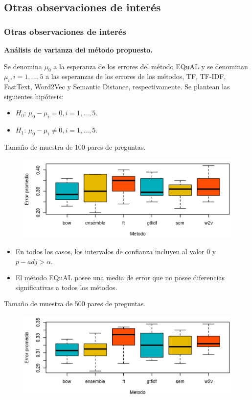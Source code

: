 \subsection{Otras observaciones de interés}
\begin{frame}
	\frametitle{Otras observaciones de interés}
	\textbf{Análisis de varianza del método propuesto.}
	\bigskip

	Se denomina \(\mu_0\) a la esperanza de los errores del método EQuAL y se denominan \(\mu_i, i = 1,..., 5\) a las esperanzas de los errores de los métodos, TF, TF-IDF, FastText, Word2Vec y Semantic Distance, respectivamente. Se plantean las siguientes hipótesis:
	\bigskip
	\begin{itemize}[<*>]
		\item \textbf{\(H_0\)}: \(\mu_0 - \mu_i = 0, i = 1,..., 5\).
		\item \textbf{\(H_1\)}: \(\mu_0 - \mu_i \neq 0, i = 1,..., 5\).
	\end{itemize}

	\framebreak

	\footnotesize
	Tamaño de muestra de 100 pares de preguntas.
	\begin{figure}[!htbp]
		\centering
		\includegraphics[width=0.7\linewidth]{../10_resultados/imagenes/anova_100}
		\label{fig:anova100-1}
	\end{figure}

	\begin{itemize}[<*>]
		\item En todos los casos, los intervalos de confianza incluyen al valor 0 y \(p{-}adj > \alpha\).
		\item El método EQuAL posee una media de error que no posee diferencias significativas a todos los métodos.
	\end{itemize}

	\framebreak

	Tamaño de muestra de 500 pares de preguntas.
	\begin{figure}[!htbp]
		\centering
		\includegraphics[width=0.7\linewidth]{../10_resultados/imagenes/anova_500}
		\label{fig:anova500-1}
	\end{figure}


\end{frame}
